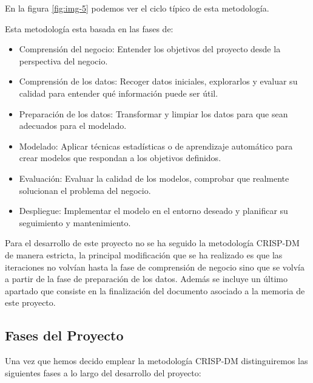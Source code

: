 En la figura \ref{fig:img-5} podemos ver el ciclo típico de esta metodología.

Esta metodología esta basada en las fases de:

\begin{itemize}
\item Comprensión del negocio: Entender los objetivos del proyecto desde la perspectiva del negocio.
\item Comprensión de los datos: Recoger datos iniciales, explorarlos y evaluar su calidad para entender qué información puede ser útil.
\item Preparación de los datos: Transformar y limpiar los datos para que sean adecuados para el modelado.
\item Modelado: Aplicar técnicas estadísticas o de aprendizaje automático para crear modelos que respondan a los objetivos definidos.
\item Evaluación: Evaluar la calidad de los modelos, comprobar que realmente solucionan el problema del negocio.
\item Despliegue: Implementar el modelo en el entorno deseado y planificar su seguimiento y mantenimiento.
\end{itemize}


Para el desarrollo de este proyecto no se ha seguido la metodología CRISP-DM de manera estricta, la principal modificación que se ha realizado es que las iteraciones no volvían hasta la fase de comprensión de negocio sino que se volvía a partir de la fase de preparación de los datos. Además se incluye un último apartado que consiste en la finalización del documento asociado a la memoria de este proyecto.

\subsection{Fases del Proyecto}
Una vez que hemos decido emplear la metodología CRISP-DM distinguiremos las siguientes fases a lo largo del desarrollo del proyecto:

